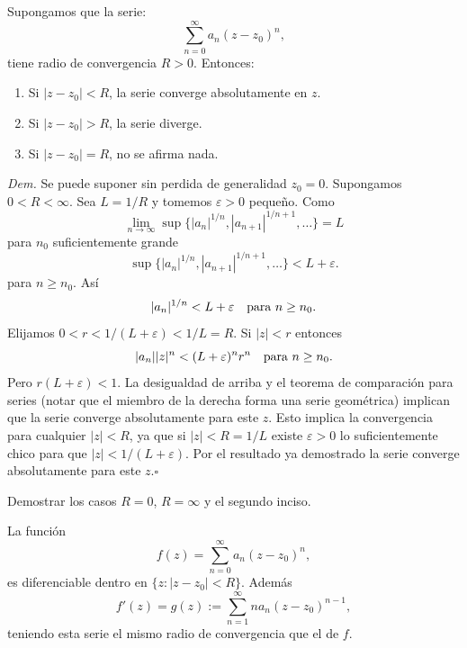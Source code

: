 \documentclass{article}
\newenvironment{demo}{\noindent\emph{Dem.}}{$\square$ \newline\vspace{5pt}}
\renewcommand{\epsilon}{\varepsilon}
\begin{document}
\begin{teorema}  Supongamos que la serie:
\[
	\sum\limits_{n=0}^{\infty}a_n(z-z_0)^n,
\]
tiene radio de convergencia $R>0$. Entonces:
\begin{enumerate}
	\item Si $|z-z_0|<R$, la serie converge absolutamente en $z$. 
	\item Si $|z-z_0|>R$, la serie diverge.
	\item Si $|z-z_0|=R$, no se afirma nada.
	
\end{enumerate}
\end{teorema}
	
 \begin{demo} Se puede suponer sin perdida de generalidad $z_0=0$. Supongamos $0<R<\infty$.  Sea $L=1/R$ y tomemos $\epsilon>0$ pequeño. Como
\[\lim_{n\to\infty}\sup\{|a_n|^{1/n},|a_{n+1}|^{1/n+1},\ldots\}=L\]
para $n_0$ suficientemente grande
\[\sup\{|a_n|^{1/n},|a_{n+1}|^{1/n+1},\ldots\}<L+\epsilon.\]
para $n\geq n_0$.   Así
\[|a_n|^{1/n}<L+\epsilon\quad\hbox{para } n\geq n_0.\]
Elijamos $0<r<1/(L+\epsilon)<1/L=R$. Si $|z|<r$ entonces
\[|a_n||z|^n<(L+\epsilon)^nr^n\quad\hbox{para } n\geq n_0.\]
Pero $r(L+\epsilon)<1$. La desigualdad de arriba y el teorema de comparación para series (notar que el miembro de la derecha forma una serie geométrica) implican que la serie converge absolutamente para este $z$.  Esto implica la convergencia para cualquier $|z|<R$, ya que si $|z|<R=1/L$ existe $\epsilon>0$ lo suficientemente chico para que $|z|<1/(L+\epsilon)$. Por el resultado ya demostrado la serie converge absolutamente para este $z$.\end{demo}
\begin{ejercicio} Demostrar los casos $R=0$, $R=\infty$ y el segundo inciso.
 \end{ejercicio}
\begin{teorema}  La función
\[
f(z)=	\sum\limits_{n=0}^{\infty}a_n(z-z_0)^n,
\]
es diferenciable dentro en $\{z:|z-z_0|<R\}$. Además
\[
f'(z)=g(z):=	\sum\limits_{n=1}^{\infty}na_n(z-z_0)^{n-1},
\]
teniendo esta serie el mismo radio de convergencia que el de $f$.
\end{teorema}
\end{document}
